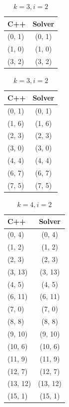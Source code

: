 \documentclass{article}
\begin{document}
\begin{table}[H]
\centering
\begin{minipage}{0.45\textwidth}
\centering
\begin{tabular}{|l|c|}
\hline
C++ & Solver\\
\hline
(0, 1)&(0, 1)\\
(1, 0)&(1, 0)\\
(3, 2)&(3, 2)\\
\hline
\end{tabular}
\caption{$k=2,i=1$}
\end{minipage}
\hfill
\begin{minipage}{0.45\textwidth}
\centering
\begin{tabular}{|l|c|}
\hline
C++ & Solver\\
\hline
(0, 1)&(0, 1)\\
(1, 6)&(1, 6)\\
(2, 3)&(2, 3)\\
(3, 0)&(3, 0)\\
(4, 4)&(4, 4)\\
(6, 7)&(6, 7)\\
(7, 5)&(7, 5)\\
\hline
\end{tabular}
\caption{$k=3,i=2$ }
\end{minipage}
\end{table}

\begin{table}[H]
\centering
\begin{tabular}{|l|c|}
\hline
C++ & Solver\\
\hline
(0, 4) & (0, 4)\\
(1, 2) & (1, 2)\\
(2, 3) &(2, 3)\\
(3, 13)& (3, 13)\\
(4, 5) &(4, 5)\\
(6, 11)& (6, 11)\\
(7, 0) &(7, 0)\\
(8, 8) &(8, 8)\\
(9, 10)& (9, 10)\\
(10, 6)& (10, 6)\\
(11, 9)& (11, 9)\\
(12, 7)& (12, 7)\\
(13, 12)& (13, 12)\\
(15, 1) &(15, 1)\\
\hline
\end{tabular}
\caption{$k=4,i=2$ }
\end{table}
\end{document}
